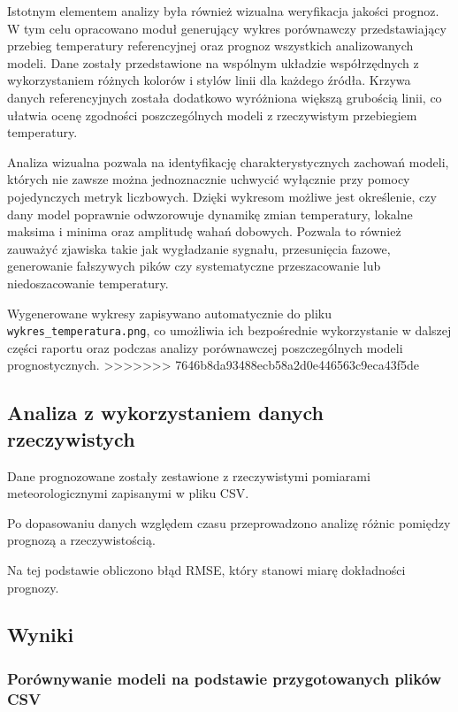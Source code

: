 \documentclass[a4paper,12pt]{article}
\begin{document}
Istotnym elementem analizy była również wizualna weryfikacja jakości prognoz. W tym celu opracowano moduł generujący wykres porównawczy przedstawiający przebieg temperatury referencyjnej oraz prognoz wszystkich analizowanych modeli. Dane zostały przedstawione na wspólnym układzie współrzędnych z wykorzystaniem różnych kolorów i stylów linii dla każdego źródła. Krzywa danych referencyjnych została dodatkowo wyróżniona większą grubością linii, co ułatwia ocenę zgodności poszczególnych modeli z rzeczywistym przebiegiem temperatury. 

\noindent
Analiza wizualna pozwala na identyfikację charakterystycznych zachowań modeli, których nie zawsze można jednoznacznie uchwycić wyłącznie przy pomocy pojedynczych metryk liczbowych. Dzięki wykresom możliwe jest określenie, czy dany model poprawnie odwzorowuje dynamikę zmian temperatury, lokalne maksima i minima oraz amplitudę wahań dobowych. Pozwala to również zauważyć zjawiska takie jak wygładzanie sygnału, przesunięcia fazowe, generowanie fałszywych pików czy systematyczne przeszacowanie lub niedoszacowanie temperatury.

\noindent
Wygenerowane wykresy zapisywano automatycznie do pliku \texttt{wykres\_temperatura.png}, co umożliwia ich bezpośrednie wykorzystanie w dalszej części raportu oraz podczas analizy porównawczej poszczególnych modeli prognostycznych. 
>>>>>>> 7646b8da93488ecb58a2d0e446563c9eca43f5de

\subsection{Analiza z wykorzystaniem danych rzeczywistych}

Dane prognozowane zostały zestawione z rzeczywistymi pomiarami
meteorologicznymi zapisanymi w pliku CSV.

\noindent
Po dopasowaniu danych względem czasu przeprowadzono analizę
różnic pomiędzy prognozą a rzeczywistością.

\noindent
Na tej podstawie obliczono błąd RMSE, który stanowi miarę
dokładności prognozy.


\subsection{Wyniki}

\subsubsection{Porównywanie modeli na podstawie przygotowanych plików CSV}
\end{document}
